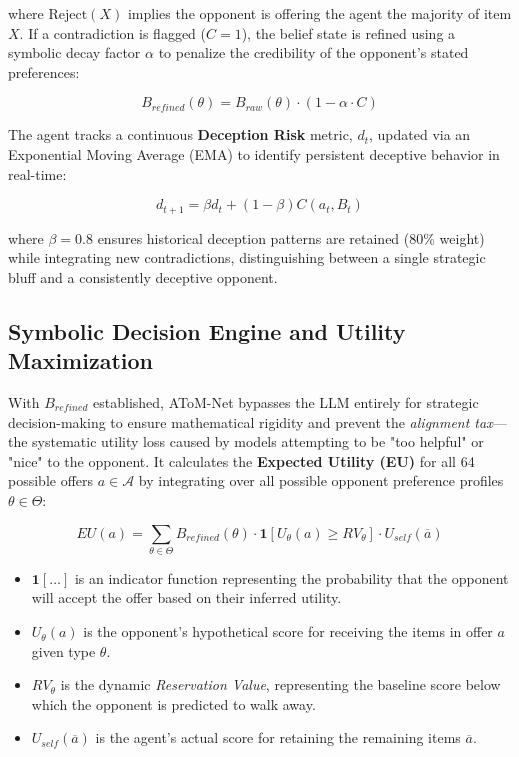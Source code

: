 \documentclass[11pt]{article}
\begin{document}
where $\text{Reject}(X)$ implies the opponent is offering the agent the majority of item $X$. If a contradiction is flagged ($C=1$), the belief state is refined using a symbolic decay factor $\alpha$ to penalize the credibility of the opponent's stated preferences:

\begin{equation}
B_{refined}(\theta) = B_{raw}(\theta) \cdot (1 - \alpha \cdot C)
\end{equation}

The agent tracks a continuous \textbf{Deception Risk}  metric, $d_t$, updated via an Exponential Moving Average (EMA) to identify persistent deceptive behavior in real-time:

\begin{equation}
d_{t+1} = \beta d_{t} + (1 - \beta)C(a_t, B_t)
\end{equation}

where $\beta=0.8$ ensures historical deception patterns are retained (80\% weight) while integrating new contradictions, distinguishing between a single strategic bluff and a consistently deceptive opponent.

\subsection{Symbolic Decision Engine and Utility Maximization}

With $B_{refined}$ established, AToM-Net bypasses the LLM entirely for strategic decision-making to ensure mathematical rigidity and prevent the \textit{alignment tax}—the systematic utility loss caused by models attempting to be "too helpful" or "nice" to the opponent. It calculates the \textbf{Expected Utility (EU)} for all 64 possible offers $a \in \mathcal{A}$ by integrating over all possible opponent preference profiles $\theta \in \Theta$:

\begin{equation}
EU(a) = \sum_{\theta \in \Theta} B_{refined}(\theta) \cdot 
\mathbf{1}\left[U_{\theta}(a) \ge RV_{\theta}\right] \cdot U_{self}(\overline{a})
\end{equation}

\begin{itemize}
    \item $\mathbf{1}[\dots]$ is an indicator function representing the probability that the opponent will accept the offer based on their inferred utility.
    \item $U_{\theta}(a)$ is the opponent's hypothetical score for receiving the items in offer $a$ given type $\theta$.
    \item $RV_{\theta}$ is the dynamic \textit{Reservation Value}, representing the baseline score below which the opponent is predicted to walk away.
    \item $U_{self}(\overline{a})$ is the agent's actual score for retaining the remaining items $\overline{a}$.
\end{itemize}
\end{document}
